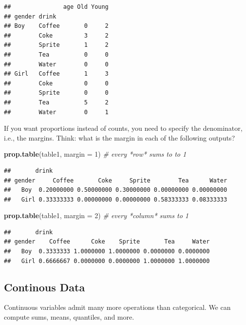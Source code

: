 \documentclass[]{book}
\newenvironment{Shaded}{\begin{snugshade}}{\end{snugshade}}
\newcommand{\KeywordTok}[1]{\textcolor[rgb]{0.13,0.29,0.53}{\textbf{#1}}}
\newcommand{\DataTypeTok}[1]{\textcolor[rgb]{0.13,0.29,0.53}{#1}}
\newcommand{\DecValTok}[1]{\textcolor[rgb]{0.00,0.00,0.81}{#1}}
\newcommand{\CommentTok}[1]{\textcolor[rgb]{0.56,0.35,0.01}{\textit{#1}}}
\newcommand{\NormalTok}[1]{#1}
\theoremstyle{definition}
\theoremstyle{definition}
\theoremstyle{definition}
\theoremstyle{remark}
\begin{document}
\begin{verbatim}
##               age Old Young
## gender drink               
## Boy    Coffee       0     2
##        Coke         3     2
##        Sprite       1     2
##        Tea          0     0
##        Water        0     0
## Girl   Coffee       1     3
##        Coke         0     0
##        Sprite       0     0
##        Tea          5     2
##        Water        0     1
\end{verbatim}

If you want proportions instead of counts, you need to specify the
denominator, i.e., the margins. Think: what is the margin in each of the
following outputs?

\begin{Shaded}
\begin{Highlighting}[]
\KeywordTok{prop.table}\NormalTok{(table1, }\DataTypeTok{margin =} \DecValTok{1}\NormalTok{) }\CommentTok{# every *row* sums to to 1}
\end{Highlighting}
\end{Shaded}

\begin{verbatim}
##       drink
## gender     Coffee       Coke     Sprite        Tea      Water
##   Boy  0.20000000 0.50000000 0.30000000 0.00000000 0.00000000
##   Girl 0.33333333 0.00000000 0.00000000 0.58333333 0.08333333
\end{verbatim}

\begin{Shaded}
\begin{Highlighting}[]
\KeywordTok{prop.table}\NormalTok{(table1, }\DataTypeTok{margin =} \DecValTok{2}\NormalTok{) }\CommentTok{# every *column* sums to 1}
\end{Highlighting}
\end{Shaded}

\begin{verbatim}
##       drink
## gender    Coffee      Coke    Sprite       Tea     Water
##   Boy  0.3333333 1.0000000 1.0000000 0.0000000 0.0000000
##   Girl 0.6666667 0.0000000 0.0000000 1.0000000 1.0000000
\end{verbatim}

\subsection{Continous Data}\label{continous-data}

Continuous variables admit many more operations than categorical. We can
compute sums, means, quantiles, and more.
\end{document}
